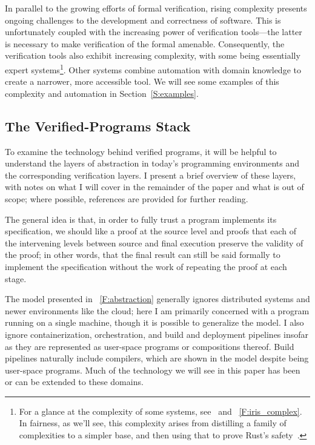 In parallel to the growing efforts of formal verification, rising complexity
presents ongoing challenges to the development and correctness of software. This
is unfortunately coupled with the increasing power of verification tools---the
latter is necessary to make verification of the formal amenable. Consequently,
the verification tools also exhibit increasing complexity, with some being
essentially expert systems\footnote{For a glance at the complexity of some
systems, see~\cite{Jung_2015,Jung_2016,Krebbers_2017a,Jung_2018b} and
\figurename~\ref{F:iris_complex}. In fairness, as we'll see, this complexity
arises from distilling a family of complexities to a simpler base, and then
using that to prove Rust's safety~\cite{Jung_2018a}.}. Other systems combine
automation with domain knowledge to create a narrower, more accessible tool. We
will see some examples of this complexity and automation in
Section~\ref{S:examples}.

\subsection{The Verified-Programs Stack}\label{S:stack}

To examine the technology behind verified programs, it will be helpful to
understand the layers of abstraction in today's programming environments and the
corresponding verification layers. I present a brief overview of these layers,
with notes on what I will cover in the remainder of the paper and what is out of
scope; where possible, references are provided for further reading.

The general idea is that, in order to fully trust a program implements its
specification, we should like a proof at the source level and proofs that each
of the intervening levels between source and final execution preserve the
validity of the proof; in other words, that the final result can still be said
formally to implement the specification without the work of repeating the proof
at each stage.

The model presented in \figurename~\ref{F:abstraction} generally ignores
distributed systems and newer environments like the cloud; here I am primarily
concerned with a program running on a single machine, though it is possible to
generalize the model. I also ignore containerization, orchestration, and build
and deployment pipelines insofar as they are represented as user-space programs
or compositions thereof. Build pipelines naturally include compilers, which are
shown in the model despite being user-space programs. Much of the technology we
will see in this paper has been or can be extended to these domains.


